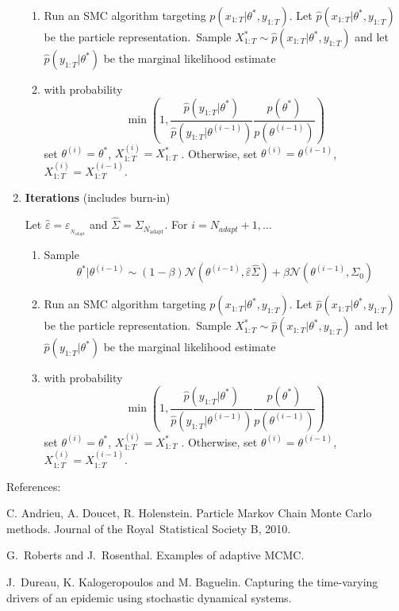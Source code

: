 \documentclass{article}%
\begin{document}
\begin{enumerate}
\begin{enumerate}
\item Run an SMC algorithm targeting $p(x_{1:T}|\theta^{\ast},y_{1:T})$. Let
$\widehat{p}(x_{1:T}|\theta^{\ast},y_{1:T})$ be the particle
representation.\ Sample $X_{1:T}^{\ast}\sim\widehat{p}(x_{1:T}|\theta^{\ast
},y_{1:T})$ and let $\widehat{p}(y_{1:T}|\theta^{\ast})$ be the marginal
likelihood estimate

\item with probability%
\begin{equation}
\min\left(  1,\frac{\widehat{p}(y_{1:T}|\theta^{\ast})}{\widehat{p}%
(y_{1:T}|\theta^{(i-1)})}\frac{p(\theta^{\ast})}{p(\theta^{(i-1)})}\right)
\end{equation}
set $\theta^{(i)}=\theta^{\ast}$, $X_{1:T}^{(i)}=X_{1:T}^{\ast}$ . Otherwise,
set $\theta^{(i)}=\theta^{(i-1)}$, $X_{1:T}^{(i)}=X_{1:T}^{(i-1)}$.
\end{enumerate}

\item \textbf{Iterations} (includes burn-in)

Let $\widehat{\varepsilon}=\varepsilon_{_{N_{\text{adapt}}}}$ and
$\widehat{\Sigma}=\Sigma_{N_{\text{adapt}}}$. For $i=N_{adapt}+1,\ldots$

\begin{enumerate}
\item Sample
\[
\theta^{\ast}|\theta^{(i-1)}\sim(1-\beta)\mathcal{N}(\theta^{(i-1)}%
,\widehat{\varepsilon}\widehat{\Sigma})+\beta\mathcal{N}\left(  \theta
^{(i-1)},\Sigma_{0}\right)
\]


\item Run an SMC algorithm targeting $p(x_{1:T}|\theta^{\ast},y_{1:T})$. Let
$\widehat{p}(x_{1:T}|\theta^{\ast},y_{1:T})$ be the particle
representation.\ Sample $X_{1:T}^{\ast}\sim\widehat{p}(x_{1:T}|\theta^{\ast
},y_{1:T})$ and let $\widehat{p}(y_{1:T}|\theta^{\ast})$ be the marginal
likelihood estimate

\item with probability%
\begin{equation}
\min\left(  1,\frac{\widehat{p}(y_{1:T}|\theta^{\ast})}{\widehat{p}%
(y_{1:T}|\theta^{(i-1)})}\frac{p(\theta^{\ast})}{p(\theta^{(i-1)})}\right)
\end{equation}
set $\theta^{(i)}=\theta^{\ast}$, $X_{1:T}^{(i)}=X_{1:T}^{\ast}$ . Otherwise,
set $\theta^{(i)}=\theta^{(i-1)}$, $X_{1:T}^{(i)}=X_{1:T}^{(i-1)}$.\bigskip
\end{enumerate}
\end{enumerate}

\bigskip

References:

C. Andrieu, A. Doucet, R. Holenstein. Particle Markov Chain Monte Carlo
methods. Journal of the Royal\ Statistical Society B, 2010.

G.\ Roberts and J.\ Rosenthal. Examples of adaptive MCMC.

J.\ Dureau, K. Kalogeropoulos and M. Baguelin. Capturing the time-varying
drivers of an epidemic using stochastic dynamical systems.
\end{document}
